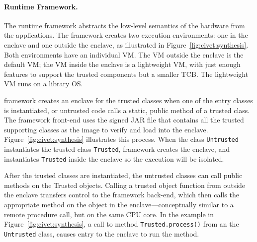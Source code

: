 




\paragraph{\sysname{} Runtime Framework.}
The \sysname{} runtime framework abstracts the low-level semantics of the \sgx{} hardware from the applications.
The \sysname{} framework creates two \java{} execution environments: 
one in the enclave and one outside the enclave, as illustrated in Figure~\ref{fig:civet:synthesis}.
Both environments have an individual \java{} VM.
The \java{} VM outside the enclave is the default \java{} VM; the \java{} VM inside the enclave is a lightweight \java{} VM,
with just enough features to support the trusted components but a smaller TCB.
The lightweight \java{} VM runs on a library OS.

 
\sysname{} framework creates an enclave for the trusted classes
when one of the entry classes is instantiated,
or untrusted code calls a static, public method of a trusted class.
The \sysname{} framework front-end uses the signed JAR file that
contains all the trusted supporting classes
as the image to verify and load into the enclave.
Figure~\ref{fig:civet:synthesis} illustrates this process.
When the class {\tt Untrusted} instantiates the trusted class {\tt Trusted},
\sysname{} framework creates the enclave,
and instantiates {\tt Trusted} inside the enclave so the execution will be isolated.


After the trusted classes are instantiated, the untrusted classes can call public methods on the Trusted objects.
Calling a trusted object function from outside the enclave transfers control to the \sysname{} framework back-end, which then 
calls the appropriate method on the object in the enclave---conceptually similar to a remote procedure call, but on the same CPU core.
In the example in Figure~\ref{fig:civet:synthesis}, a call to method {\tt Trusted.process()} from an the {\tt Untrusted} class,
causes entry to the enclave to run the method.

